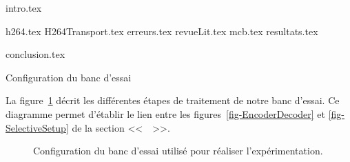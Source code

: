 \documentclass [memoire, letterpaper, oneside, 12pt]{thETS-utf8}
\newcommand{\fig}[1]{figure~\ref{#1}}
\begin{document}
\begin{listofabbr}[3cm] 

\end{listofabbr}






\reversemarginpar %

\begin{introduction}
{intro.tex}
\end{introduction}

{h264.tex}
{H264Transport.tex}
{erreurs.tex}
{revueLit.tex}
{mcb.tex}
{resultats.tex}

\begin{conclusion}
{conclusion.tex}
\end{conclusion}


\appendix
\multiannexe %
%
\captionsetup{list=no}
\begin{chapter}{Configuration du banc d'essai}
\label{Ann-Setup}

La \fig{fig-Setup} décrit les différentes étapes de traitement de notre banc
d'essai. Ce diagramme permet d'établir le lien entre les
figures~\ref{fig-EncoderDecoder} et \ref{fig-SelectiveSetup} de la section
<<~~>>.
\begin{figure}[h]
	\caption{Configuration du banc d'essai utilisé pour réaliser
	l'expérimentation.}
	\label{fig-Setup}
\end{figure}
\end{chapter}
\end{document}
